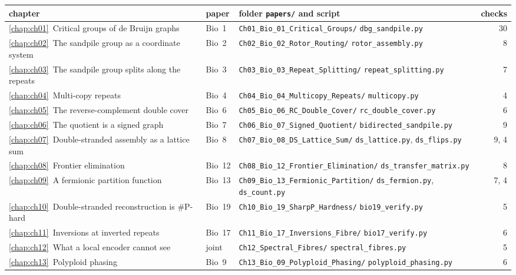 \medskip
{\small
\renewcommand{\arraystretch}{1.15}
\begin{longtable}{>{\raggedright\arraybackslash}p{}l>{\raggedright\arraybackslash}p{}r}
\toprule
chapter & paper & folder \texttt{papers/} and script & checks\\
\midrule
\endhead
\ref{chap:ch01}\ Critical groups of de Bruijn graphs & Bio~1 & \texttt{Ch01\_Bio\_01\_Critical\_Groups/} \texttt{dbg\_sandpile.py} & 30\\
\ref{chap:ch02}\ The sandpile group as a coordinate system & Bio~2 & \texttt{Ch02\_Bio\_02\_Rotor\_Routing/} \texttt{rotor\_assembly.py} & 8\\
\ref{chap:ch03}\ The sandpile group splits along the repeats & Bio~3 & \texttt{Ch03\_Bio\_03\_Repeat\_Splitting/} \texttt{repeat\_splitting.py} & 7\\
\ref{chap:ch04}\ Multi-copy repeats & Bio~4 & \texttt{Ch04\_Bio\_04\_Multicopy\_Repeats/} \texttt{multicopy.py} & 4\\
\ref{chap:ch05}\ The reverse-complement double cover & Bio~6 & \texttt{Ch05\_Bio\_06\_RC\_Double\_Cover/} \texttt{rc\_double\_cover.py} & 6\\
\ref{chap:ch06}\ The quotient is a signed graph & Bio~7 & \texttt{Ch06\_Bio\_07\_Signed\_Quotient/} \texttt{bidirected\_sandpile.py} & 9\\
\ref{chap:ch07}\ Double-stranded assembly as a lattice sum & Bio~8 & \texttt{Ch07\_Bio\_08\_DS\_Lattice\_Sum/} \texttt{ds\_lattice.py}, \texttt{ds\_flips.py} & 9, 4\\
\ref{chap:ch08}\ Frontier elimination & Bio~12 & \texttt{Ch08\_Bio\_12\_Frontier\_Elimination/} \texttt{ds\_transfer\_matrix.py} & 8\\
\ref{chap:ch09}\ A fermionic partition function & Bio~13 & \texttt{Ch09\_Bio\_13\_Fermionic\_Partition/} \texttt{ds\_fermion.py}, \texttt{ds\_count.py} & 7, 4\\
\ref{chap:ch10}\ Double-stranded reconstruction is \#P-hard & Bio~19 & \texttt{Ch10\_Bio\_19\_SharpP\_Hardness/} \texttt{bio19\_verify.py} & 5\\
\ref{chap:ch11}\ Inversions at inverted repeats & Bio~17 & \texttt{Ch11\_Bio\_17\_Inversions\_Fibre/} \texttt{bio17\_verify.py} & 6\\
\ref{chap:ch12}\ What a local encoder cannot see & joint & \texttt{Ch12\_Spectral\_Fibres/} \texttt{spectral\_fibres.py} & 5\\
\ref{chap:ch13}\ Polyploid phasing & Bio~9 & \texttt{Ch13\_Bio\_09\_Polyploid\_Phasing/} \texttt{polyploid\_phasing.py} & 6\\

\end{longtable}}
